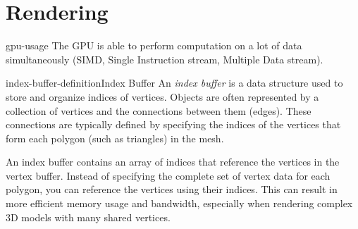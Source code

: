 \documentclass[preview]{standalone}
\begin{document}
\genpage

\section{Rendering}

\begin{snippet}{gpu-usage}
The GPU is able to perform computation on a lot of data simultaneously
(SIMD, Single Instruction stream, Multiple Data stream).
\end{snippet}


\begin{snippetdefinition}{index-buffer-definition}{Index Buffer}
    An \textit{index buffer} is a data structure used to store and organize indices of vertices.
    Objects are often represented by a collection of vertices and the connections between them (edges).
    These connections are typically defined by specifying the indices of the vertices that
    form each polygon (such as triangles) in the mesh.

    An index buffer contains an array of indices that reference the vertices in the vertex buffer. Instead of specifying the complete set of vertex data for each polygon, you can reference the vertices using their indices. This can result in more efficient memory usage and bandwidth, especially when rendering complex 3D models with many shared vertices.
\end{snippetdefinition}
\end{document}
